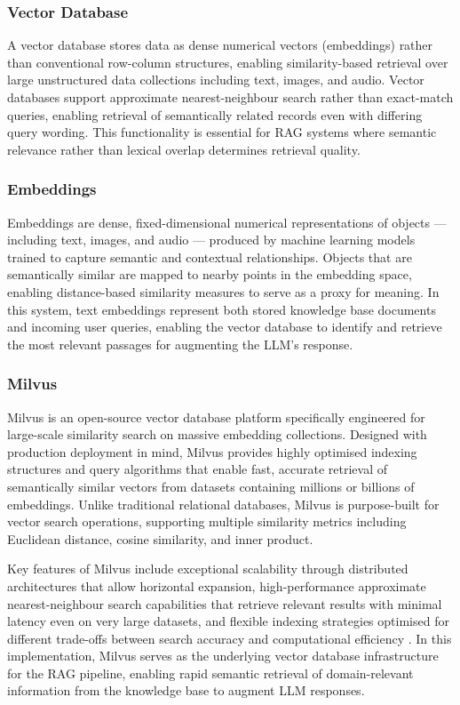 \subsubsection{Vector Database}

A vector database stores data as dense numerical vectors (embeddings) rather than conventional row-column structures, enabling similarity-based retrieval over large unstructured data collections including text, images, and audio. Vector databases support approximate nearest-neighbour search rather than exact-match queries, enabling retrieval of semantically related records even with differing query wording. This functionality is essential for RAG systems where semantic relevance rather than lexical overlap determines retrieval quality.

\subsubsection{Embeddings}

Embeddings are dense, fixed-dimensional numerical representations of objects — including text, images, and audio — produced by machine learning models trained to capture semantic and contextual relationships. Objects that are semantically similar are mapped to nearby points in the embedding space, enabling distance-based similarity measures to serve as a proxy for meaning. In this system, text embeddings represent both stored knowledge base documents and incoming user queries, enabling the vector database to identify and retrieve the most relevant passages for augmenting the LLM's response.

\subsubsection{Milvus}

Milvus is an open-source vector database platform specifically engineered for large-scale similarity search on massive embedding collections. Designed with production deployment in mind, Milvus provides highly optimised indexing structures and query algorithms that enable fast, accurate retrieval of semantically similar vectors from datasets containing millions or billions of embeddings. Unlike traditional relational databases, Milvus is purpose-built for vector search operations, supporting multiple similarity metrics including Euclidean distance, cosine similarity, and inner product.

Key features of Milvus include exceptional scalability through distributed architectures that allow horizontal expansion, high-performance approximate nearest-neighbour search capabilities that retrieve relevant results with minimal latency even on very large datasets, and flexible indexing strategies optimised for different trade-offs between search accuracy and computational efficiency \cite{milvus}. In this implementation, Milvus serves as the underlying vector database infrastructure for the RAG pipeline, enabling rapid semantic retrieval of domain-relevant information from the knowledge base to augment LLM responses.

